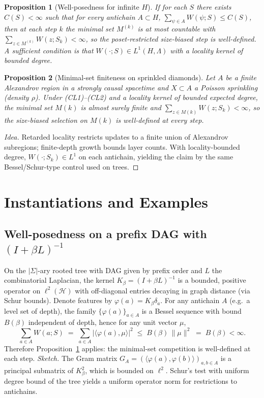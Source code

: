 \documentclass[12pt,a4paper]{article}
\newtheorem{proposition}{Proposition}
\begin{document}
\begin{proposition}[Well-posedness for infinite $H$]\label{prop:finite_antichain_intensity}
If for each $S$ there exists $C(S)<\infty$ such that for every antichain $A\subset H$,
$\sum_{\psi\in A} W(\psi;S) \le C(S)$, then at each step $k$ the minimal set $M^{(k)}$ is at most countable with $\sum_{z\in M^{(k)}} W(z;S_k)<\infty$, so the poset-restricted size-biased step is well-defined.
A sufficient condition is that $W(\cdot;S)\in L^1(H,\Lambda)$ with a locality kernel of bounded degree.
\end{proposition}

\begin{proposition}[Minimal-set finiteness on sprinkled diamonds]\label{prop:diamond-finiteness}
Let \(A\) be a finite Alexandrov region in a strongly causal spacetime and \(X\subset A\) a Poisson
sprinkling (density \(\rho\)). Under \textup{(CL1)}–\textup{(CL2)} and a locality kernel of bounded expected
degree, the minimal set \(M(k)\) is almost surely finite and \(\sum_{z\in M(k)}W(z;S_k)<\infty\),
so the size-biased selection on \(M(k)\) is well-defined at every step.
\end{proposition}
\begin{proof}[Idea]
Retarded locality restricts updates to a finite union of Alexandrov subregions; finite-depth growth
bounds layer counts. With locality-bounded degree, \(W(\cdot;S_k)\in L^1\) on each antichain,
yielding the claim by the same Bessel/Schur-type control used on trees.
\end{proof}

\section{Instantiations and Examples}

\subsection{Well-posedness on a prefix DAG with $(I+\beta L)^{-1}$}\label{subsec:wellposed_prefix}
On the $|\Sigma|$-ary rooted tree with DAG given by prefix order and $L$ the combinatorial Laplacian, the kernel $K_\beta=(I+\beta L)^{-1}$ is a bounded, positive operator on $\ell^2(\mathcal{H})$ with off-diagonal entries decaying in graph distance (via Schur bounds).
Denote features by $\varphi(a)=K_\beta \delta_a$.
For any antichain $A$ (e.g.\ a level set of depth), the family $\{\varphi(a)\}_{a\in A}$ is a Bessel sequence with bound $B(\beta)$ independent of depth, hence for any unit vector $\mu$,
\[
\sum_{a\in A} W(a;S) \;=\; \sum_{a\in A} |\langle \varphi(a),\mu\rangle|^2 \;\le\; B(\beta)\,\|\mu\|^2 \;=\; B(\beta)<\infty.
\]
Therefore Proposition~\ref{prop:finite_antichain_intensity} applies: the minimal-set competition is well-defined at each step.
\emph{Sketch.} The Gram matrix $G_A=(\langle \varphi(a),\varphi(b)\rangle)_{a,b\in A}$ is a principal submatrix of $K_\beta^2$, which is bounded on $\ell^2$. Schur's test with uniform degree bound of the tree yields a uniform operator norm for restrictions to antichains.
 
\end{document}

